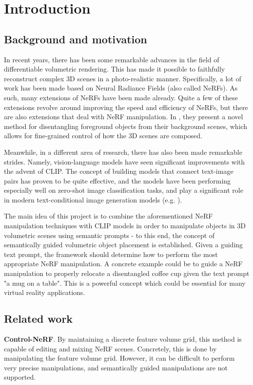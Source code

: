 \chapter{Introduction}
\label{chapter:introduction}
\section{Background and motivation}
In recent years, there has been some remarkable advances in the field of differentiable volumetric rendering. This has made it possible to faithfully reconstruct complex 3D scenes in a photo-realistic manner. Specifically, a lot of work has been made based on Neural Radiance Fields\cite{nerf2020} (also called NeRFs). As such, many extensions of NeRFs have been made already. Quite a few of these extensions revolve around improving the speed and efficiency of NeRFs\cite{mueller2022}, but there are also extensions that deal with NeRF manipulation. In \cite{benaim2022}, they present a novel method for disentangling foreground objects from their background scenes, which allows for fine-grained control of how the 3D scenes are composed.

Meanwhile, in a different area of research, there has also been made remarkable strides. Namely, vision-language models have seen significant improvements with the advent of CLIP\cite{radford2021}. The concept of building models that connect text-image pairs has proven to be quite effective, and the models have been performing especially well on zero-shot image classification tasks, and play a significant role in modern text-conditional image generation models (e.g. \cite{ramesh2022}). 

The main idea of this project is to combine the aforementioned NeRF manipulation techniques with CLIP models in order to manipulate objects in 3D volumetric scenes using semantic prompts - to this end, the concept of semantically guided volumetric object placement is established. Given a guiding text prompt, the framework should determine how to perform the most appropriate NeRF manipulation. A concrete example could be to guide a NeRF manipulation to properly relocate a disentangled coffee cup given the text prompt "a mug on a table". This is a powerful concept which could be essential for many virtual reality applications.

\section{Related work}
\textbf{Control-NeRF}\cite{control-nerf}. By maintaining a discrete feature volume grid, this method is capable of editing and mixing NeRF scenes. Concretely, this is done by manipulating the feature volume grid. However, it can be difficult to perform very precise manipulations, and semantically guided manipulations are not supported.

